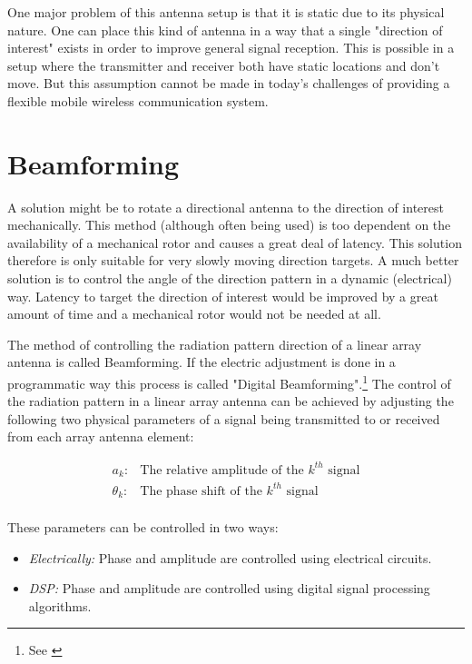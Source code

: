 One major problem of this antenna setup is that it is static due to its physical nature. One can place this kind of antenna in a way that a single "direction of interest" exists in order to improve general signal reception. This is possible in a setup where the transmitter and receiver both have static locations and don't move. But this assumption cannot be made in today's challenges of providing a flexible mobile wireless communication system.

\section{Beamforming}
A solution might be to rotate a directional antenna to the direction of interest mechanically. This method (although often being used) is too dependent on the availability of a mechanical rotor and causes a great deal of latency. This solution therefore is only suitable for very slowly moving direction targets. A much better solution is to control the angle of the direction pattern in a dynamic (electrical) way. Latency to target the direction of interest would be improved by a great amount of time and a mechanical rotor would not be needed at all.

The method of controlling the radiation pattern direction of a linear array antenna is called Beamforming. If the electric adjustment is done in a programmatic way this process is called "Digital Beamforming".\footnote{See \cite{primer}} The control of the radiation pattern in a linear array antenna can be achieved by adjusting the following two physical parameters of a signal being transmitted to or received from each array antenna element:

\begin{equation}
\begin{array}{ll}
a_k: & \textrm{The relative amplitude of the $k^{th}$ signal} \\
\theta_k: & \textrm{The phase shift of the $k^{th}$ signal} \\
\end{array}
\end{equation}

These parameters can be controlled in two ways:

\begin{itemize}
\item \emph{Electrically:} Phase and amplitude are controlled using electrical circuits.
\item \emph{DSP:} Phase and amplitude are controlled using digital signal processing algorithms.
\end{itemize}

